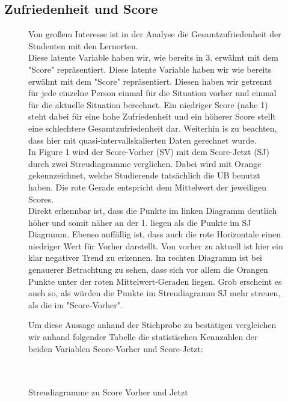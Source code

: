 \documentclass[11pt, a4paper]{article}
\begin{document}
\subsection{Zufriedenheit und Score}
\begin{figure}[htb]
Von großem Interesse ist in der Analyse die Gesamtzufriedenheit der Studenten mit den Lernorten.\\ Diese latente Variable haben wir, wie bereits in 3. erwähnt mit dem "Score" repräsentiert. Diese latente Variable haben wir wie bereits erwähnt mit dem "Score" repräsentiert.
Diesen haben wir getrennt für jede einzelne Person einmal für die Situation vorher und einmal für die aktuelle Situation berechnet.
Ein niedriger Score (nahe 1) steht dabei für eine hohe Zufriedenheit und ein höherer Score stellt eine schlechtere Gesamtzufriedenheit dar.
Weiterhin is zu beachten, dass hier mit quasi-intervallskalierten Daten gerechnet wurde. \\
In Figure 1 wird der Score-Vorher (SV) mit dem Score-Jetzt (SJ) durch zwei Streudiagramme verglichen.
Dabei wird mit Orange gekennzeichnet, welche Studierende tatsächlich die UB benutzt haben. Die rote Gerade entspricht dem Mittelwert der jeweiligen Scores. \\
Direkt erkennbar ist, dass die Punkte im linken Diagramm deutlich höher und somit näher an der 1. liegen als die Punkte im SJ Diagramm.
Ebenso auffällig ist, dass auch die rote Horizontale einen niedriger Wert für Vorher darstellt. 
Von vorher zu aktuell ist hier ein klar negativer Trend zu erkennen.
Im rechten Diagramm ist bei genauerer Betrachtung zu sehen, dass sich vor allem die Orangen Punkte unter der roten Mittelwert-Geraden liegen.
Grob erscheint es auch so, als würden die Punkte im Streudiagramm SJ mehr streuen, als die im "Score-Vorher".

{\centering 
\vspace{-2cm}
\caption{Streudiagramme zu Score Vorher und Jetzt}}

\vspace{1cm}
Um diese Aussage anhand der Stichprobe zu bestätigen vergleichen wir anhand folgender Tabelle die statistischen Kennzahlen der beiden Variablen Score-Vorher und Score-Jetzt:\\\\\\
\end{figure}
\end{document}
